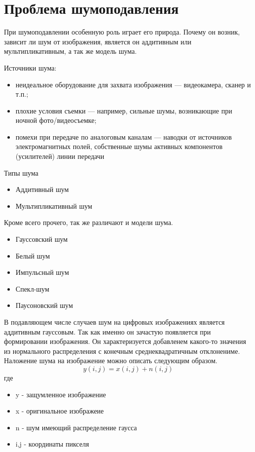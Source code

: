 \section{Проблема шумоподавления}
При шумоподавлении особенную роль играет его природа. Почему он возник, зависит ли шум от изображения, является он аддитивным
или мультипликативным, а так же модель шума. 

Источники шума\cite{Gonzalez}:
\begin{itemize}
	\item неидеальное оборудование для захвата изображения — видеокамера, сканер и
	т.п.;
	\item плохие условия съемки — например, сильные шумы, возникающие при
	ночной фото/видеосъемке;
	\item помехи при передаче по аналоговым каналам — наводки от источников
	электромагнитных полей, собственные шумы активных компонентов
	(усилителей) линии передачи
\end{itemize}

Типы шума
\begin{itemize}
	\item Аддитивный шум
	\item Мультипликативный шум
\end{itemize}

Кроме всего прочего, так же различают и модели шума.
\begin{itemize}
	\item Гауссовский шум
	\item Белый шум
	\item Импульсный шум
	\item Спекл-шум
	\item Паусоновский шум
\end{itemize}

В подавляющем числе случаев шум на цифровых изображениях является аддитивным гауссовым. Так
как именно он зачастую появляется при формировании изображения. Он характеризуется добавленем какого-то
значения из нормального распределения с конечным среднеквадратичным отклонениме. Наложение шума
на изображение можно описать следующим образом.
\begin{equation}\label{eModelNoise}
	y(i,j)=x(i,j)+n(i,j)
\end{equation}
где
\begin{itemize}
	\item y - защумленное изображение
	\item x - оригинальное изображеие
	\item n - шум имеющий распределение гаусса
	\item i,j - координаты пикселя
\end{itemize}

